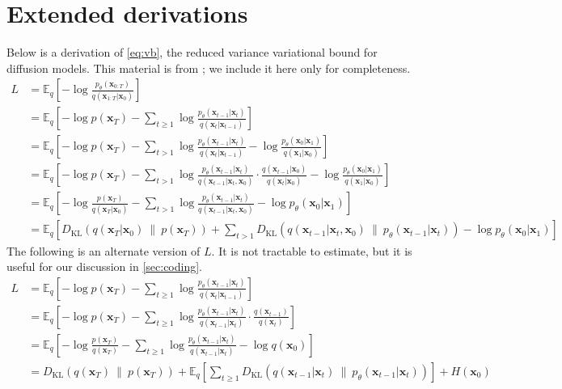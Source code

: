 \documentclass{article}
\newcommand{\E}{\mathbb{E}}
\newcommand{\Eb}[2]{\E_{#1}\!\left[#2\right]}
\newcommand{\kl}[2]{D_{\mathrm{KL}}\!\left(#1 ~ \| ~ #2\right)}
\newcommand{\bx}{\mathbf{x}}
\begin{document}
\section{Extended derivations}
\label{sec:extended_derivations}

Below is a derivation of \cref{eq:vb}, the reduced variance variational bound for diffusion models. This material is from \citet{sohl2015deep}; we include it here only for completeness.
\begingroup
\allowdisplaybreaks
\begin{align}
L &= \Eb{q}{ - \log \frac{p_\theta(\bx_{0:T})}{q(\bx_{1:T} | \bx_0)}} \\
  &= \Eb{q}{ -\log p(\bx_T) - \sum_{t \geq 1} \log \frac{p_\theta(\bx_{t-1} | \bx_t)}{q(\bx_t|\bx_{t-1})} } \\
  &= \Eb{q}{ -\log p(\bx_T) - \sum_{t > 1} \log \frac{p_\theta(\bx_{t-1} | \bx_t)}{q(\bx_t|\bx_{t-1})} - \log\frac{p_\theta(\bx_0|\bx_1)}{q(\bx_1|\bx_0)} } \\
  &= \Eb{q}{ -\log p(\bx_T) - \sum_{t > 1} \log \frac{p_\theta(\bx_{t-1} | \bx_t)}{q(\bx_{t-1}|\bx_t,\bx_0)}\cdot\frac{q(\bx_{t-1}|\bx_0)}{q(\bx_t|\bx_0)} - \log\frac{p_\theta(\bx_0|\bx_1)}{q(\bx_1|\bx_0)} } \\
  &= \Eb{q}{ -\log \frac{p(\bx_T)}{q(\bx_T|\bx_0)} - \sum_{t > 1} \log \frac{p_\theta(\bx_{t-1} | \bx_t)}{q(\bx_{t-1}|\bx_t,\bx_0)} - \log p_\theta(\bx_0|\bx_1) } \\
  &= \Eb{q}{ \kl{q(\bx_T|\bx_0)}{p(\bx_T)} + \sum_{t > 1} \kl{q(\bx_{t-1}|\bx_t,\bx_0)}{p_\theta(\bx_{t-1} | \bx_t)} - \log p_\theta(\bx_0|\bx_1) }
\end{align}
The following is an alternate version of $L$. It is not tractable to estimate, but it is useful for our discussion in \cref{sec:coding}.
\begin{align}
L &= \Eb{q}{ -\log p(\bx_T) - \sum_{t \geq 1} \log \frac{p_\theta(\bx_{t-1} | \bx_t)}{q(\bx_t|\bx_{t-1})} } \\
  &= \Eb{q}{ -\log p(\bx_T) - \sum_{t \geq 1} \log \frac{p_\theta(\bx_{t-1} | \bx_t)}{q(\bx_{t-1}|\bx_t)} \cdot \frac{q(\bx_{t-1})}{q(\bx_t)} } \\
  &= \Eb{q}{ -\log \frac{p(\bx_T)}{q(\bx_T)} - \sum_{t \geq 1} \log \frac{p_\theta(\bx_{t-1} | \bx_t)}{q(\bx_{t-1}|\bx_t)} -\log q(\bx_0) } \\
  &= \kl{q(\bx_T)}{p(\bx_T)} + \Eb{q}{ \sum_{t \geq 1} \kl{q(\bx_{t-1}|\bx_t)}{p_\theta(\bx_{t-1}|\bx_t)} } + H(\bx_0)
\end{align}
\endgroup
\end{document}
